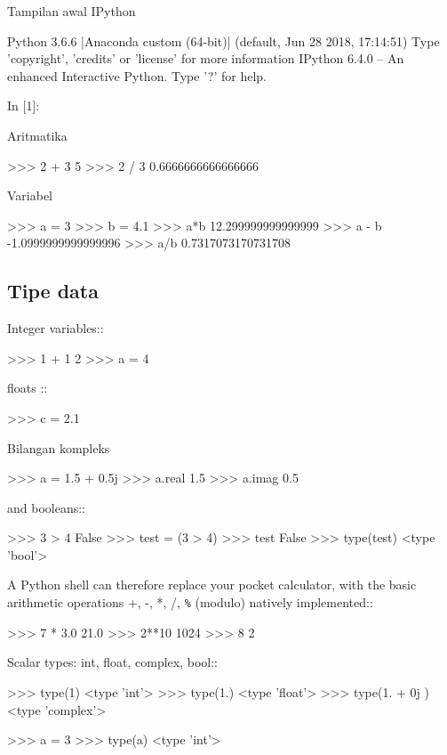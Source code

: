 \documentclass[a4paper,11pt]{extarticle}
\begin{document}
Tampilan awal IPython
\begin{textcode}
Python 3.6.6 |Anaconda custom (64-bit)| (default, Jun 28 2018, 17:14:51) 
Type 'copyright', 'credits' or 'license' for more information
IPython 6.4.0 -- An enhanced Interactive Python. Type '?' for help.

In [1]:
\end{textcode}

Aritmatika
\begin{pyconcode}
>>> 2 + 3
5
>>> 2 / 3
0.6666666666666666
\end{pyconcode}

Variabel
\begin{pyconcode}
>>> a = 3
>>> b = 4.1
>>> a*b
12.299999999999999
>>> a - b
-1.0999999999999996
>>> a/b
0.7317073170731708
\end{pyconcode}

\subsection{Tipe data}

Integer variables::
\begin{pyconcode}
>>> 1 + 1
2
>>> a = 4
\end{pyconcode}

floats ::
\begin{pyconcode}
>>> c = 2.1
\end{pyconcode}

Bilangan kompleks
\begin{pyconcode}
>>> a = 1.5 + 0.5j
>>> a.real
1.5
>>> a.imag
0.5
\end{pyconcode}

and booleans::
\begin{pyconcode}
>>> 3 > 4
False
>>> test = (3 > 4)
>>> test
False
>>> type(test)
<type 'bool'>
\end{pyconcode}


A Python shell can therefore replace your pocket calculator, with the
basic arithmetic operations +, -, *, /, \texttt{\%} (modulo)
natively implemented::
\begin{pyconcode}
>>> 7 * 3.0
21.0
>>> 2**10
1024
>>> 8%
2
\end{pyconcode}

Scalar types: int, float, complex, bool::
\begin{pyconcode}
>>> type(1)
<type 'int'>
>>> type(1.)
<type 'float'>
>>> type(1. + 0j )
<type 'complex'>

>>> a = 3
>>> type(a)
<type 'int'>
\end{pyconcode}
\end{document}
